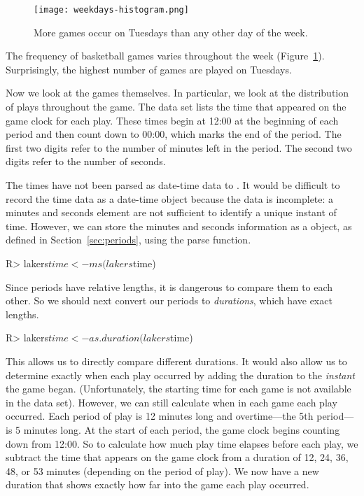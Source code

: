 \documentclass[article]{jss}
\begin{document}
\begin{figure}[htpb]
  \centering
    \texttt{[image: weekdays-histogram.png]}
  \caption{More games occur on Tuesdays than any other day of the week.}
  \label{fig:games-days}
\end{figure}


The frequency of basketball games varies throughout the week (Figure~\ref{fig:games-days}). Surprisingly, the highest number of games are played on Tuesdays.

Now we look at the games themselves. In particular, we look at the distribution of plays throughout the game. The  data set lists the time that appeared on the game clock for each play. These times begin at 12:00 at the beginning of each period and then count down to 00:00, which marks the end of the period. The first two digits refer to the number of minutes left in the period. The second two digits refer to the number of seconds.

The times have not been parsed as date-time data to . It would be difficult to record the time data as a date-time object because the data is incomplete: a minutes and seconds element are not sufficient to identify a unique instant of time. However, we can store the minutes and seconds information as a \emph{} object, as defined in Section~\ref{sec:periods}, using the  parse function.

\begin{CodeInput}
R> lakers$time <- ms(lakers$time)
\end{CodeInput}

Since periods have relative lengths, it is dangerous to compare them to each other. So we should next convert our periods to \emph{durations}, which have exact lengths.

\begin{CodeInput}
R> lakers$time <- as.duration(lakers$time)
\end{CodeInput}

This allows us to directly compare different durations. It would also allow us to determine exactly when each play occurred by adding the duration to the \emph{instant} the game began. (Unfortunately, the starting time for each game is not available in the data set). However, we can still calculate when in each game each play occurred. Each period of play is 12 minutes long and overtime---the 5th period---is 5 minutes long. At the start of each period, the game clock begins counting down from 12:00. So to calculate how much play time elapses before each play, we subtract the time that appears on the game clock from a duration of 12, 24, 36, 48, or 53 minutes (depending on the period of play). We now have a new duration that shows exactly how far into the game each play occurred.
\end{document}
